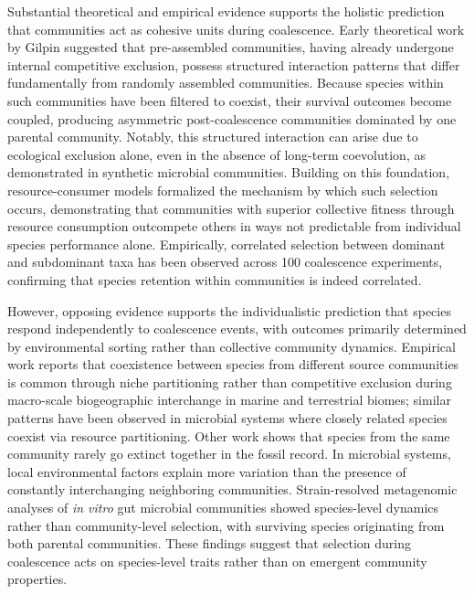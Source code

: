 Substantial theoretical and empirical evidence supports the holistic prediction that communities act as cohesive units during coalescence. Early theoretical work by Gilpin\citep{Gilpin1994} suggested that pre-assembled communities, having already undergone internal competitive exclusion, possess structured interaction patterns that differ fundamentally from randomly assembled communities. Because species within such communities have been filtered to coexist, their survival outcomes become coupled, producing asymmetric post-coalescence communities dominated by one parental community\citep{Debray2022}. Notably, this structured interaction can arise due to ecological exclusion alone, even in the absence of long-term coevolution, as demonstrated in synthetic microbial communities\citep{Venturelli2018, Maynard2020}. Building on this foundation, resource-consumer models formalized the mechanism by which such selection occurs, demonstrating that communities with superior collective fitness through resource consumption outcompete others in ways not predictable from individual species performance alone\citep{Tikhonov2016, Lechon2021, Xie2019, Xie2021}. Empirically, correlated selection between dominant and subdominant taxa has been observed across 100 coalescence experiments, confirming that species retention within communities is indeed correlated\citep{DiazColunga2022}. 

However, opposing evidence supports the individualistic prediction that species respond independently to coalescence events, with outcomes primarily determined by environmental sorting rather than collective community dynamics. Empirical work reports that coexistence between species from different source communities is common through niche partitioning rather than competitive exclusion during macro-scale biogeographic interchange in marine and terrestrial biomes\citep{Vermeij1991}; similar patterns have been observed in microbial systems where closely related species coexist via resource partitioning\citep{Brochet2021}. Other work shows that species from the same community rarely go extinct together in the fossil record\citep{BentonEmerson2007}. In microbial systems, local environmental factors explain more variation than the presence of constantly interchanging neighboring communities\citep{VanderGucht2007}. Strain-resolved metagenomic analyses of \textit{in vitro} gut microbial communities %
showed species-level dynamics rather than community-level selection, with surviving species originating from both parental communities\citep{Goldman2025, Walton2025}. These findings suggest that selection during coalescence acts on species-level traits rather than on emergent community properties.

